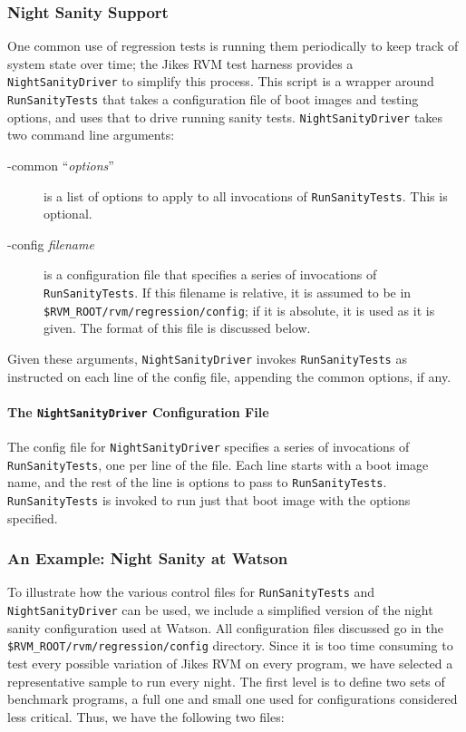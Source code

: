 \subsubsection{Night Sanity Support}
 
One common use of regression tests is running them periodically to
keep track of system state over time; the Jikes RVM test harness
provides a {\tt{NightSanityDriver}} to simplify this process.  This
script is a wrapper around {\tt{RunSanityTests}} that takes a
configuration file of boot images and testing options, and uses that
to drive running sanity tests.  {\tt{NightSanityDriver}} takes two
command line arguments:
\begin{description}
\item[-common ``{\em{options}}''] is a list of options to apply to all
invocations of {\tt{RunSanityTests}}.  This is optional.
\item[-config {\em filename}] is a configuration file that specifies a
series of invocations of {\tt{RunSanityTests}}.  If this filename is
relative, it is assumed to be in {\tt \$RVM\_ROOT/rvm/regression/config}; if
it is absolute, it is used as it is given.  The format of this file is
discussed below.
\end{description}

 Given these arguments, {\tt{NightSanityDriver}} invokes
{\tt{RunSanityTests}} as instructed on each line of the config file,
appending the common options, if any.

\paragraph{The \texttt{\textbf{NightSanityDriver}} Configuration File}

 The config file for {\tt{NightSanityDriver}} specifies a series of
invocations of {\tt{RunSanityTests}}, one per line of the file.  Each
line starts with a boot image name, and the rest of the line is
options to pass to {\tt{RunSanityTests}}.  {\tt{RunSanityTests}} is
invoked to run just that boot image with the options specified.

\subsubsection{An Example: Night Sanity at Watson}

 To illustrate how the various control files for {\tt{RunSanityTests}}
and {\tt{NightSanityDriver}} can be used, we include a simplified
version of the night sanity configuration used at Watson.  All
configuration files discussed go in the
{\tt \$RVM\_ROOT/rvm/regression/config} directory. Since it is
too time consuming to test every possible variation of Jikes RVM on
every program, we have selected a representative sample to run every
night.  The first level is to define two sets of benchmark programs, a
full one and small one used for configurations considered less
critical.  Thus, we have the following two files:

